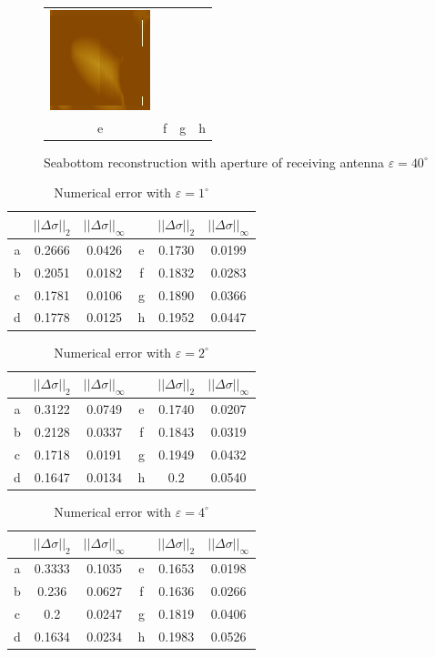 \documentclass{procDDs}
\begin{document}
\begin{figure}[h!]
\begin{tabular}{cccc}
		\includegraphics[width=0.2\linewidth]{img/17/12.jpg}\\
		e & f & g & h
	\end{tabular}
	\caption{Seabottom reconstruction with aperture of receiving antenna $\varepsilon=40^\circ$}
	\label{ris:desc6}
\end{figure}
\begin{table}[h!]
	\begin{tabular}{|c|c|c||c|c|c|}
		\hline
		& $||\Delta\sigma||_2$ & $||\Delta\sigma||_\infty$ &
		& $||\Delta\sigma||_2$ & $||\Delta\sigma||_\infty$ \\ \hline
		a & 0.2666 & 0.0426 & e &  0.1730 & 0.0199\\ \hline
		b & 0.2051 & 0.0182 & f &  0.1832 & 0.0283\\ \hline
		c & 0.1781 & 0.0106 & g &  0.1890 & 0.0366\\ \hline
		d & 0.1778 & 0.0125 & h &  0.1952 & 0.0447\\ \hline
	\end{tabular}
	\label{table:desc1}
	\caption{Numerical error with $\varepsilon=1^\circ$}
\end{table}
\begin{table}[h!]
	\begin{tabular}{|c|c|c||c|c|c|}
		\hline
		& $||\Delta\sigma||_2$ & $||\Delta\sigma||_\infty$ &
		& $||\Delta\sigma||_2$ & $||\Delta\sigma||_\infty$ \\ \hline
		a & 0.3122 & 0.0749 & e &  0.1740 & 0.0207\\ \hline
		b & 0.2128 & 0.0337 & f &  0.1843 & 0.0319\\ \hline
		c & 0.1718 & 0.0191 & g &  0.1949 & 0.0432\\ \hline
		d & 0.1647 & 0.0134 & h &  0.2 & 0.0540\\ \hline
	\end{tabular}
	\label{table:desc2}
	\caption{Numerical error with $\varepsilon=2^\circ$}	
\end{table}
\begin{table}[h!]
	\begin{tabular}{|c|c|c||c|c|c|}
		\hline
		& $||\Delta\sigma||_2$ & $||\Delta\sigma||_\infty$ &
		& $||\Delta\sigma||_2$ & $||\Delta\sigma||_\infty$ \\ \hline
		a & 0.3333 & 0.1035 & e &  0.1653 & 0.0198\\ \hline
		b & 0.236 & 0.0627 & f &  0.1636 & 0.0266\\ \hline
		c & 0.2 & 0.0247 & g &  0.1819 & 0.0406\\ \hline
		d & 0.1634 & 0.0234 & h &  0.1983 & 0.0526\\ \hline
	\end{tabular}
	\label{table:desc3}
	\caption{Numerical error with $\varepsilon=4^\circ$}	
\end{table}
\end{document}
